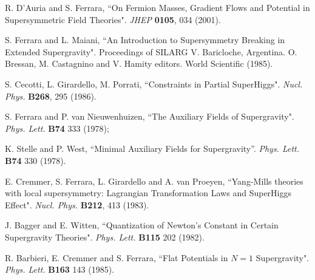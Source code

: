 \documentclass[a4paper,12pt]{article}
\begin{document}
\begin{thebibliography}{99}
  R. D'Auria and S. Ferrara, ``On Fermion Masses, Gradient Flows and Potential in
Supersymmetric Field Theories". {\it JHEP} {\bf 0105}, 034 (2001).

S. Ferrara and L. Maiani, ``An Introduction to Supersymmetry Breaking in Extended Supergravity".
Proceedings of SILARG V. Baricloche, Argentina. O. Bressan, M.
Castagnino and V.
Hamity editors. World Scientific (1985).

 S. Cecotti, L. Girardello, M. Porrati, ``Constraints in Partial SuperHiggs". {\it
Nucl.
Phys. } {\bf B268}, 295
(1986).

 S. Ferrara and P. van Nieuwenhuizen, ``The Auxiliary Fields of Supergravity". {\it
Phys.
Lett. } {\bf B74} 333 (1978);

K. Stelle and P. West, ``Minimal Auxiliary Fields for Supergravity''. {\it Phys. Lett.} {\bf B74} 330 (1978).


 E. Cremmer, S. Ferrara, L. Girardello and A. van Proeyen, ``Yang-Mills theories with
local
supersymmetry: Lagrangian Transformation Laws and SuperHiggs Effect". {\it  Nucl. Phys. } {\bf B212}, 413
(1983).


 J. Bagger and E. Witten, ``Quantization of Newton's Constant in Certain Supergravity
Theories". {\it Phys. Lett.} {\bf B115} 202 (1982).

 R. Barbieri, E. Cremmer and S. Ferrara, ``Flat Potentials in $N=1$ Supergravity".
{\it Phys. Lett.} {\bf B163} 143 (1985).


\end{thebibliography}
\end{document}
